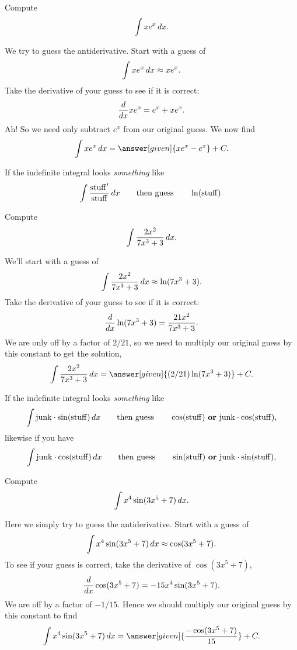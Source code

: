 \documentclass{ximera}
\begin{document}
\begin{example}
Compute
\[
\int xe^{x} \,d x.
\]
\begin{explanation}
We try to guess the antiderivative. Start with a guess of
\[
\int xe^x \,d x \approx xe^x.
\]
Take the derivative of your guess to see if it is correct:
\[
\frac{d}{dx} xe^x = e^x + xe^x.
\]
Ah! So we need only subtract $e^x$ from our original guess.  We now
find
\[
\int xe^x \d x =\answer[given]{xe^x - e^x} + C.
\]
\end{explanation}
\end{example}





\begin{template}\label{template:lnchain}
If the indefinite integral looks \emph{something} like
\[
\int \frac{\mathrm{stuff}'}{\mathrm{stuff}}\,d x \qquad\text{then guess}\qquad\ln(\mathrm{stuff}).
\]
\end{template}

\begin{example}
Compute
\[
\int \frac{2x^2}{7x^3 + 3} \,d x.
\]
\begin{explanation}
We'll start with a guess of
\[
\int \frac{2x^2}{7x^3 + 3} \,d x \approx \ln(7x^3+3).
\]
Take the derivative of your guess to see if it is correct:
\[
\frac{d}{dx} \ln(7x^3+3) = \frac{21x^2}{7x^3 + 3}.
\]
We are only off by a factor of $2/21$, so we need to multiply our
original guess by this constant to get the solution,
\[
\int \frac{2x^2}{7x^3 + 3} \d x = \answer[given]{(2/21)\ln(7x^3+3)}+C.
\]
\end{explanation}
\end{example}




\begin{template}\label{template:trigchain}
If the indefinite integral looks \emph{something} like
\[
\int \mathrm{junk}\cdot \sin(\mathrm{stuff}) \,d x \qquad\text{then
  guess}\qquad \cos(\mathrm{stuff}) \text{ \textbf{or} }\mathrm{junk}
\cdot \cos(\mathrm{stuff}),
\]
likewise if you have 
\[
\int \mathrm{junk}\cdot \cos(\mathrm{stuff}) \,d x \qquad\text{then
  guess}\qquad \sin(\mathrm{stuff}) \text{ \textbf{or} }\mathrm{junk}
\cdot \sin(\mathrm{stuff}),
\]
\end{template}



\begin{example}
Compute
\[
\int x^4\sin(3x^5+7) \,d x.
\]
\begin{explanation}
Here we simply try to guess the antiderivative. Start with a guess of
\[
\int x^4\sin(3x^5+7)\,d x \approx \cos(3x^5+7).
\]
To see if your guess is correct, take the derivative of $\cos(3x^5+7)$,
\[
\frac{d}{dx} \cos(3x^5+7) = -15x^4\sin(3x^5+7).
\]
We are off by a factor of $-1/15$. Hence we should multiply our
original guess by this constant to find
\[
\int x^4\sin(3x^5+7) \d x = \answer[given]{\frac{-\cos(3x^5+7)}{15}} + C.
\]
\end{explanation}
\end{example}
\end{document}
